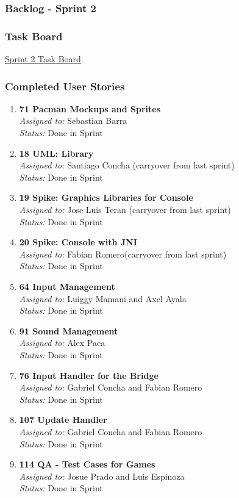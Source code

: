 \subsubsection{Backlog - Sprint 2}

\subsubsection*{Task Board}
\href{https://tree.taiga.io/project/joseluis-teran-coffeetime/taskboard/sprint-2-12274}{Sprint 2 Task Board}

\subsubsection*{Completed User Stories}

\begin{enumerate}
    \item \textbf{71 Pacman Mockups and Sprites} \\
    \textit{Assigned to:} Sebastian Barra \\
    \textit{Status:} Done in Sprint
    \item \textbf{18 UML: Library} \\
    \textit{Assigned to:} Santiago Concha (carryover from last sprint) \\
    \textit{Status:} Done in Sprint
    \item \textbf{19 Spike: Graphics Libraries for Console} \\
    \textit{Assigned to:} Jose Luis Teran (carryover from last sprint)\\
    \textit{Status:} Done in Sprint
    \item \textbf{20 Spike: Console with JNI} \\
    \textit{Assigned to:} Fabian Romero(carryover from last sprint)\\
    \textit{Status:} Done in Sprint
    \item \textbf{64 Input Management} \\
    \textit{Assigned to:} Luiggy Mamani and Axel Ayala \\
    \textit{Status:} Done in Sprint
    \item \textbf{91 Sound Management} \\
    \textit{Assigned to:} Alex Paca \\
    \textit{Status:} Done in Sprint
    \item \textbf{76 Input Handler for the Bridge} \\
    \textit{Assigned to:} Gabriel Concha and Fabian Romero \\
    \textit{Status:} Done in Sprint
    \item \textbf{107 Update Handler} \\
    \textit{Assigned to:} Gabriel Concha and Fabian Romero \\
    \textit{Status:} Done in Sprint
    \item \textbf{114 QA - Test Cases for Games} \\
    \textit{Assigned to:} Josue Prado and Luis Espinoza \\
    \textit{Status:} Done in Sprint
\end{enumerate}

